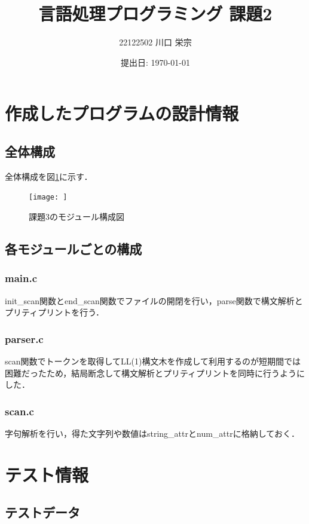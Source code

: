 \documentclass{jlreq}
\title{言語処理プログラミング 課題2}
\author{22122502 川口 栄宗}
\date{提出日: \today}
\begin{document}
\maketitle
\clearpage

\section{作成したプログラムの設計情報}

\subsection{全体構成}

全体構成を図\ref{fig:module_graph}に示す．
\begin{figure}[H]
  \centering
  \texttt{[image: ]}
  \caption{課題3のモジュール構成図}
  \label{fig:module_graph}
\end{figure}

\subsection{各モジュールごとの構成}

\subsubsection{main.c}
init\_scan関数とend\_scan関数でファイルの開閉を行い，parse関数で構文解析とプリティプリントを行う．

\subsubsection{parser.c}
scan関数でトークンを取得してLL(1)構文木を作成して利用するのが短期間では困難だったため，結局断念して構文解析とプリティプリントを同時に行うようにした．

\subsubsection{scan.c}
字句解析を行い，得た文字列や数値はstring\_attrとnum\_attrに格納しておく．

\section{テスト情報}

\subsection{テストデータ}
\end{document}
